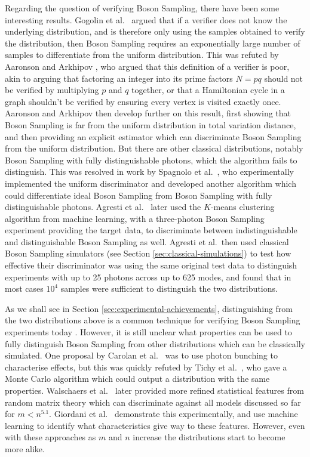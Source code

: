 Regarding the question of verifying Boson Sampling, there have been some interesting results. Gogolin et al.~\cite{gogolin2013} argued that if a verifier does not know the underlying distribution, and is therefore only using the samples obtained to verify the distribution, then Boson Sampling requires an exponentially large number of samples to differentiate from the uniform distribution. This was refuted by Aaronson and Arkhipov \cite{aaronson2014}, who argued that this definition of a verifier is poor, akin to arguing that factoring an integer into its prime factors $N=pq$ should not be verified by multiplying $p$ and $q$ together, or that a Hamiltonian cycle in a graph shouldn't be verified by ensuring every vertex is visited exactly once. Aaronson and Arkhipov then develop further on this result, first showing that Boson Sampling is far from the uniform distribution in total variation distance, and then providing an explicit estimator which can discriminate Boson Sampling from the uniform distribution. But there are other classical distributions, notably Boson Sampling with fully distinguishable photons, which the algorithm fails to distinguish. This was resolved in work by Spagnolo et al.~\cite{spagnolo2014}, who experimentally implemented the uniform discriminator and developed another algorithm which could differentiate ideal Boson Sampling from Boson Sampling with fully distinguishable photons. Agresti et al.~\cite{agresti2019} later used the $K$-means clustering algorithm from machine learning, with a three-photon Boson Sampling experiment providing the target data, to discriminate between indistinguishable and distinguishable Boson Sampling as well. Agresti et al.\ then used classical Boson Sampling simulators (see Section \ref{sec:classical-simulations}) to test how effective their discriminator was using the same original test data to distinguish experiments with up to 25 photons across up to 625 modes, and found that in most cases $10^4$ samples were sufficient to distinguish the two distributions.

As we shall see in Section \ref{sec:experimental-achievements}, distinguishing from the two distributions above is a common technique for verifying Boson Sampling experiments today \cite{carolan2015, zhong2018, paesani2018, wang2019}. However, it is still unclear what properties can be used to fully distinguish Boson Sampling from other distributions which can be classically simulated. One proposal by Carolan et al.~\cite{carolan2014} was to use photon bunching to characterise effects, but this was quickly refuted by Tichy et al.~\cite{tichy2014}, who gave a Monte Carlo algorithm which could output a distribution with the same properties. Walschaers et al.~\cite{walschaers2016, walschaers2016thesis} later provided more refined statistical features from random matrix theory which can discriminate against all models discussed so far for $m<n^{5.1}$. Giordani et al.~\cite{giordani2018} demonstrate this experimentally, and use machine learning to identify what characteristics give way to these features. However, even with these approaches as $m$ and $n$ increase the distributions start to become more alike.

